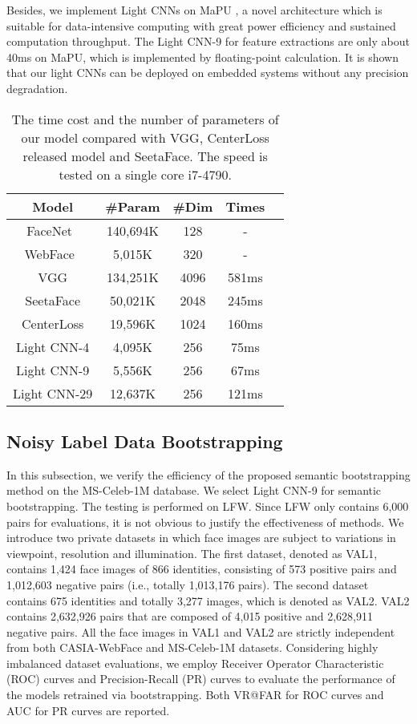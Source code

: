 \documentclass[journal,transmag]{IEEEtran}
\begin{document}
Besides, we implement Light CNNs on MaPU \cite{DBLP:conf/hpca/WangDYLMRWWXWLW16}, a novel architecture which is suitable for data-intensive computing with great power efficiency and sustained computation throughput. The Light CNN-9 for feature extractions are only about 40ms on MaPU, which is implemented by floating-point calculation. It is shown that our light CNNs can be deployed on embedded systems without any precision degradation.


\begin{table}[t]
\centering
\caption{The time cost and the number of parameters of our model compared with VGG, CenterLoss released model and SeetaFace. The speed is tested on a single core i7-4790.}
\begin{tabular}{|c|c|c|c|c|}
\hline
Model & \#Param & \#Dim & Times \\
\hline
FaceNet~\cite{schroff2015facenet} & 140,694K& 128 & - \\
WebFace~\cite{yi2014learning} & 5,015K & 320& -\\
VGG \cite{parkhi2015deep} & 134,251K & 4096&  581ms   \\
SeetaFace \cite{liu2016viplfacenet} & 50,021K & 2048 & 245ms  \\
CenterLoss \cite{wen2016discriminative} & 19,596K & 1024 & 160ms  \\
\hline
Light CNN-4 & 4,095K & 256 & 75ms  \\
Light CNN-9 & 5,556K & 256 & 67ms  \\
Light CNN-29 & 12,637K & 256 & 121ms  \\
\hline
\end{tabular}
\label{tab:speed}
\end{table}




\subsection{Noisy Label Data Bootstrapping}\label{43}

In this subsection, we verify the efficiency of the proposed semantic bootstrapping method on the MS-Celeb-1M database. We select Light CNN-9 for semantic bootstrapping. The testing is performed on LFW. Since LFW only contains 6,000 pairs for evaluations, it is not obvious to justify the effectiveness of methods. We introduce two private datasets in which face images are subject to variations in viewpoint, resolution and illumination.  The first dataset, denoted as VAL1, contains 1,424 face images of 866 identities, consisting of 573 positive pairs and 1,012,603 negative pairs (i.e., totally 1,013,176 pairs). The second dataset contains 675 identities and totally 3,277 images, which is denoted as VAL2. VAL2 contains 2,632,926 pairs that are composed of 4,015 positive and 2,628,911 negative pairs.
All the face images in VAL1 and VAL2 are strictly independent from both CASIA-WebFace and MS-Celeb-1M datasets. Considering highly imbalanced dataset evaluations, we employ Receiver Operator Characteristic (ROC) curves and Precision-Recall (PR) curves to evaluate the performance of the models retrained via bootstrapping. Both VR@FAR for ROC curves and AUC for PR curves are reported.
\end{document}
